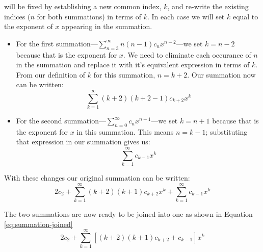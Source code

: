  will be fixed by establishing a new common index, $k$, and re-write the existing indices ($n$ for both summations) in terms of $k$.  In each case we will set $k$ equal to the exponent of $x$ appearing in the summation.
\begin{itemize}
\item For the first summation---$\sum\limits_{n=3}^{\infty} n(n-1)c_nx^{n-2}$---we set $k=n-2$ because that is the exponent for $x$. We need to eliminate each occurance of $n$ in the summation and replace it with it's equivalent expression in terms of $k$.  From our definition of $k$ for this summation, $n=k+2$. Our summation now can be written:
$$\sum\limits_{k=1}^{\infty} (k+2)(k+2-1)c_{k+2}x^k$$ 

\item For the second summation---$\sum\limits_{n=0}^{\infty} c_n x^{n+1}$---we set $k=n+1$ because that is the exponent for $x$ in this summation.  This means $n=k-1$; substituting that expression in our summation gives us:
$$\sum\limits_{k=1}^{\infty}c_{k-1}x^{k}$$
\end{itemize}

With these changes our original summation can be written:
\begin{equation}
2c_2 + \sum\limits_{k=1}^{\infty} (k+2)(k+1)c_{k+2}x^k + \sum\limits_{k=1}^{\infty}c_{k-1}x^{k}
\end{equation}

The two summations are now ready to be joined into one as shown in Equation \ref{eq:summation-joined}
\begin{equation}
2c_2 + \sum\limits_{k=1}^{\infty} \left[(k+2)(k+1)c_{k+2} + c_{k-1}\right] x^{k}
\label{eq:summation-joined}
\end{equation}

